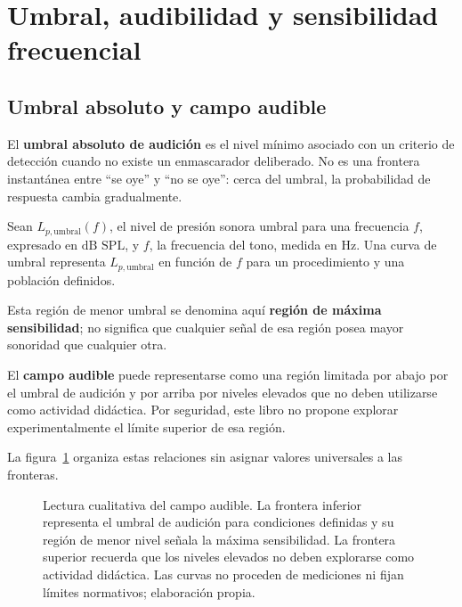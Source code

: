 \section{Umbral, audibilidad y sensibilidad frecuencial}
\label{sec:u7-umbral-audibilidad}

\subsection{Umbral absoluto y campo audible}
\label{sec:u7-umbral-absoluto}

El \textbf{umbral absoluto de audición} es el nivel mínimo asociado con un
criterio de detección cuando no existe un enmascarador deliberado. No es una
frontera instantánea entre ``se oye'' y ``no se oye'': cerca del umbral, la
probabilidad de respuesta cambia gradualmente.

Sean \(L_{p,\mathrm{umbral}}(f)\), el nivel de presión sonora umbral para una
frecuencia \(f\), expresado en \(\text{dB SPL}\), y \(f\), la frecuencia del
tono, medida en \(\text{Hz}\). Una curva de umbral representa
\(L_{p,\mathrm{umbral}}\) en función de \(f\) para un procedimiento y una
población definidos.

 Esta región de menor umbral se denomina aquí
\textbf{región de máxima sensibilidad}; no significa que cualquier señal de
esa región posea mayor sonoridad que cualquier otra.

El \textbf{campo audible} puede representarse como una región limitada por
abajo por el umbral de audición y por arriba por niveles elevados que no deben
utilizarse como actividad didáctica. 
Por seguridad, este libro no propone explorar experimentalmente el límite
superior de esa región.

La figura~\ref{fig:u7-umbral-campo-audible} organiza estas relaciones sin
asignar valores universales a las fronteras.

\begin{figure}[htbp]
    \centering
    
    \caption{Lectura cualitativa del campo audible. La frontera inferior
    representa el umbral de audición para condiciones definidas y su región de
    menor nivel señala la máxima sensibilidad. La frontera superior recuerda
    que los niveles elevados no deben explorarse como actividad didáctica. Las
    curvas no proceden de mediciones ni fijan límites normativos; elaboración
    propia.}
    \label{fig:u7-umbral-campo-audible}
\end{figure}

